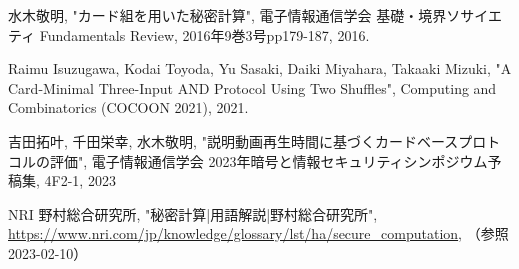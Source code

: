 \documentclass{jsreport}
\theoremstyle{plain} %
\theoremstyle{definition}
\begin{document}
\begin{thebibliography}{99}
水木敬明, "カード組を用いた秘密計算", 電子情報通信学会 基礎・境界ソサイエティ Fundamentals Review, 2016年9巻3号pp179-187, 2016.

Raimu Isuzugawa, Kodai Toyoda, Yu Sasaki, Daiki Miyahara, Takaaki Mizuki, "A Card-Minimal Three-Input AND Protocol Using Two Shuffles", Computing and Combinatorics (COCOON 2021), 2021.



吉田拓叶, 千田栄幸, 水木敬明, "説明動画再生時間に基づくカードベースプロトコルの評価", 電子情報通信学会 2023年暗号と情報セキュリティシンポジウム予稿集, 4F2-1, 2023

NRI 野村総合研究所, "秘密計算|用語解説|野村総合研究所", \url{https://www.nri.com/jp/knowledge/glossary/lst/ha/secure_computation}, （参照2023-02-10）

\end{thebibliography}
\end{document}
